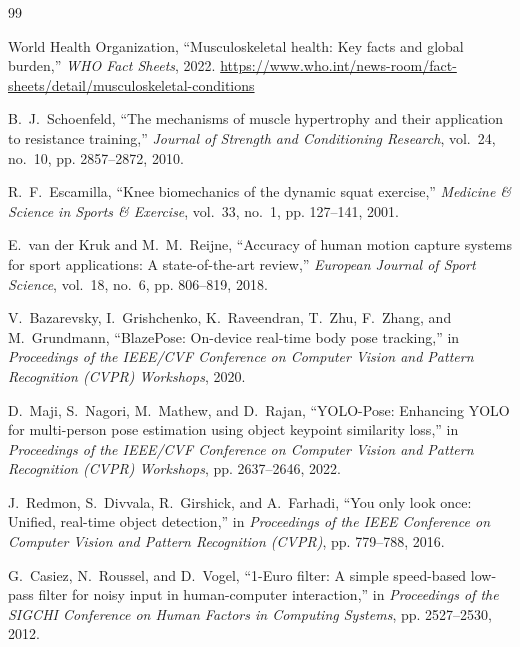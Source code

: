 \documentclass[12pt]{report}
\begin{document}
\begin{thebibliography}{99}
\footnotesize
\setlength{\itemsep}{0.12em}

World Health Organization,
\newblock ``Musculoskeletal health: Key facts and global burden,''
\newblock \emph{WHO Fact Sheets}, 2022. \url{https://www.who.int/news-room/fact-sheets/detail/musculoskeletal-conditions}

B.~J.~Schoenfeld,
\newblock ``The mechanisms of muscle hypertrophy and their application to resistance training,''
\newblock \emph{Journal of Strength and Conditioning Research}, vol.~24, no.~10, pp. 2857--2872, 2010.

R.~F.~Escamilla,
\newblock ``Knee biomechanics of the dynamic squat exercise,''
\newblock \emph{Medicine \& Science in Sports \& Exercise}, vol.~33, no.~1, pp. 127--141, 2001.

E.~van der Kruk and M.~M.~Reijne,
\newblock ``Accuracy of human motion capture systems for sport applications: A state-of-the-art review,''
\newblock \emph{European Journal of Sport Science}, vol.~18, no.~6, pp. 806--819, 2018.

V.~Bazarevsky, I.~Grishchenko, K.~Raveendran, T.~Zhu, F.~Zhang, and M.~Grundmann,
\newblock ``BlazePose: On-device real-time body pose tracking,''
\newblock in \emph{Proceedings of the IEEE/CVF Conference on Computer Vision and Pattern Recognition (CVPR) Workshops}, 2020.

D.~Maji, S.~Nagori, M.~Mathew, and D.~Rajan,
\newblock ``YOLO-Pose: Enhancing YOLO for multi-person pose estimation using object keypoint similarity loss,''
\newblock in \emph{Proceedings of the IEEE/CVF Conference on Computer Vision and Pattern Recognition (CVPR) Workshops}, pp. 2637--2646, 2022.

J.~Redmon, S.~Divvala, R.~Girshick, and A.~Farhadi,
\newblock ``You only look once: Unified, real-time object detection,''
\newblock in \emph{Proceedings of the IEEE Conference on Computer Vision and Pattern Recognition (CVPR)}, pp. 779--788, 2016.

G.~Casiez, N.~Roussel, and D.~Vogel,
\newblock ``1-Euro filter: A simple speed-based low-pass filter for noisy input in human-computer interaction,''
\newblock in \emph{Proceedings of the SIGCHI Conference on Human Factors in Computing Systems}, pp. 2527--2530, 2012.


\end{thebibliography}
\end{document}
